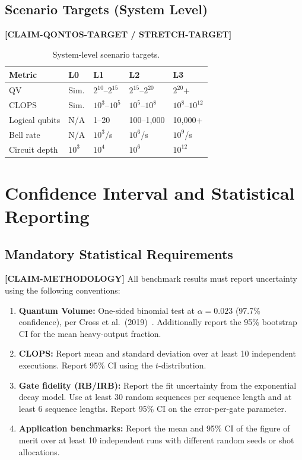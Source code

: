 \documentclass[conference]{IEEEtran}
\begin{document}
\subsection{Scenario Targets (System Level)}

\textbf{[CLAIM-QONTOS-TARGET / STRETCH-TARGET]}

\begin{table}[H]
\centering
\caption{System-level scenario targets.}
\label{tab:scenario_targets}
\begin{tabular}{@{}l l l l l@{}}
\toprule
\textbf{Metric} & \textbf{L0} & \textbf{L1} & \textbf{L2} & \textbf{L3} \\
\midrule
QV & Sim. & $2^{10}$--$2^{15}$ & $2^{15}$--$2^{20}$ & $2^{20}$+ \\
CLOPS & Sim. & $10^3$--$10^5$ & $10^5$--$10^8$ & $10^8$--$10^{12}$ \\
Logical qubits & N/A & 1--20 & 100--1,000 & 10,000+ \\
Bell rate & N/A & $10^3$/s & $10^6$/s & $10^9$/s \\
Circuit depth & $10^3$ & $10^4$ & $10^6$ & $10^{12}$ \\
\bottomrule
\end{tabular}
\end{table}

\section{Confidence Interval and Statistical Reporting}

\subsection{Mandatory Statistical Requirements}

\textbf{[CLAIM-METHODOLOGY]} All benchmark results must report uncertainty using the following conventions:

\begin{enumerate}[leftmargin=*]
\item \textbf{Quantum Volume:} One-sided binomial test at $\alpha = 0.023$ (97.7\% confidence), per Cross et al.\ (2019)~\cite{cross2019}. Additionally report the 95\% bootstrap CI for the mean heavy-output fraction.
\item \textbf{CLOPS:} Report mean and standard deviation over at least 10 independent executions. Report 95\% CI using the $t$-distribution.
\item \textbf{Gate fidelity (RB/IRB):} Report the fit uncertainty from the exponential decay model. Use at least 30 random sequences per sequence length and at least 6 sequence lengths. Report 95\% CI on the error-per-gate parameter.
\item \textbf{Application benchmarks:} Report the mean and 95\% CI of the figure of merit over at least 10 independent runs with different random seeds or shot allocations.
\end{enumerate}
\end{document}
